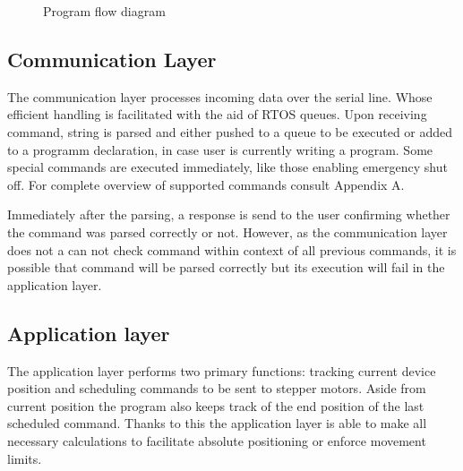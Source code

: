 \begin{figure}[h!]

  \caption[Program flow diagram]{Program flow diagram}
  \label{fig:code_diag}
\end{figure}

\subsection{Communication Layer}

The communication layer processes incoming data over the serial line.
Whose efficient handling is facilitated with the aid of RTOS queues.
Upon receiving command, string is parsed and either pushed to a queue to be executed or added to a programm declaration, in case user is currently writing a program.
Some special commands are executed immediately, like those enabling emergency shut off.
For complete overview of supported commands consult Appendix A.

Immediately after the parsing, a response is send to the user confirming whether the command was parsed correctly or not.
However, as the communication layer does not a can not check command within context of all previous commands, it is possible that command will be parsed correctly but its execution will fail in the application layer.

\subsection{Application layer}

The application layer performs two primary functions: tracking current device position and scheduling commands to be sent to stepper motors.
Aside from current position the program also keeps track of the end position of the last scheduled command.
Thanks to this the application layer is able to make all necessary calculations to facilitate absolute positioning or enforce movement limits.

